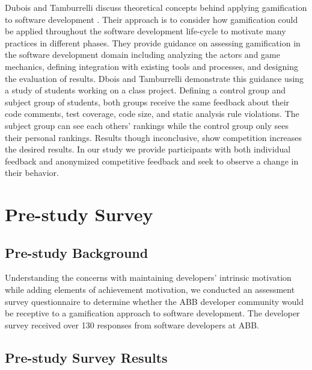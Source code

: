 \documentclass{sig-alternate}
\begin{document}
Dubois and Tamburrelli discuss theoretical concepts behind applying gamification to software development \cite{Dubois2013Understanding}. Their approach is to consider how gamification could be applied throughout the software development life-cycle to motivate many practices in different phases.  They provide guidance on assessing gamification in the software development domain including analyzing the actors and game mechanics, defining integration with existing tools and processes, and designing the evaluation of results.  Dbois and Tamburrelli demonstrate this guidance using a study of students working on a class project.  Defining a control group and subject group of students, both groups receive the same feedback about their code comments, test coverage, code size, and static analysis rule violations.  The subject group can see each others' rankings while the control group only sees their personal rankings.  Results though inconclusive, show competition increases the desired results.  In our study we provide participants with both individual feedback and anonymized competitive feedback and seek to observe a change in their behavior.

\section{Pre-study Survey}

\subsection{Pre-study Background}

Understanding the concerns with maintaining developers'  intrinsic motivation while adding elements of achievement motivation, we conducted an assessment survey questionnaire to determine whether the ABB developer community would be receptive to a gamification approach to software development.  The developer survey received over 130 responses from software developers at ABB.

\subsection{Pre-study Survey Results}
\end{document}
